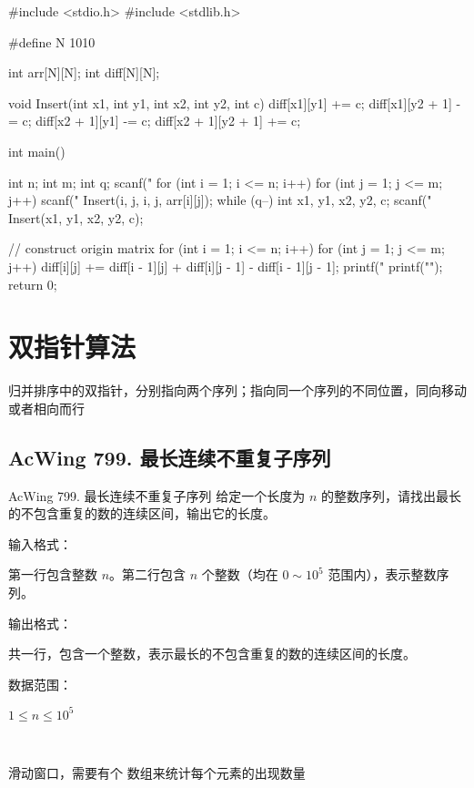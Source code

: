 \begin{mycpptwocol}[差分矩阵]
    #include <stdio.h>
    #include <stdlib.h>

    #define N 1010

    int arr[N][N];
    int diff[N][N];

    void Insert(int x1, int y1, int x2, int y2, int c) {
        diff[x1][y1] += c;
        diff[x1][y2 + 1] -= c;
        diff[x2 + 1][y1] -= c;
        diff[x2 + 1][y2 + 1] += c;
    }

    int main() {
        int n;
        int m;
        int q;
        scanf("%
        for (int i = 1; i <= n; i++) {
            for (int j = 1; j <= m; j++) {
                scanf("%
                Insert(i, j, i, j, arr[i][j]);
            }
        }
        while (q--) {
            int x1, y1, x2, y2, c;
            scanf("%
            Insert(x1, y1, x2, y2, c);
        }

        // construct origin matrix
        for (int i = 1; i <= n; i++) {
            for (int j = 1; j <= m; j++) {
                diff[i][j] += diff[i - 1][j] + diff[i][j - 1] - diff[i - 1][j - 1];
                printf("%
            }
            printf("\n");
        }
        return 0;
    }
\end{mycpptwocol}


\section{双指针算法}
归并排序中的双指针，分别指向两个序列；指向同一个序列的不同位置，同向移动或者相向而行

\subsection{AcWing 799. 最长连续不重复子序列}
\begin{titledbox}{AcWing 799. 最长连续不重复子序列}
    给定一个长度为 $n$ 的整数序列，请找出最长的不包含重复的数的连续区间，输出它的长度。

    输入格式：

    第一行包含整数 $n$。第二行包含 $n$ 个整数（均在 $0 \sim 10^5$ 范围内），表示整数序列。

    输出格式：

    共一行，包含一个整数，表示最长的不包含重复的数的连续区间的长度。

    数据范围：

    $1 \le n \le 10^5$

    \begin{inputblock}
         \\
    \end{inputblock}
    \begin{outputblock}
    \end{outputblock}
\end{titledbox}
滑动窗口，需要有个  数组来统计每个元素的出现数量

